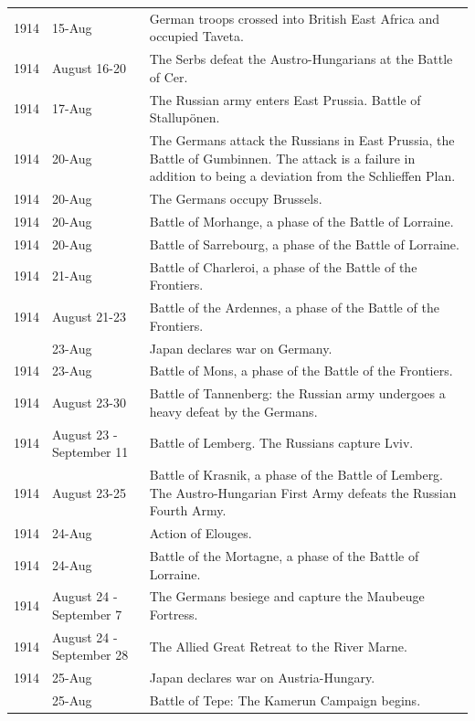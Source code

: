 \documentclass[
  openany]{book}
\begin{document}
\begin{longtable}[t]{rl>{\raggedright\arraybackslash}p{22em}}
\rowcolor{gray!6}  1914 & 15-Aug & German troops crossed into British East Africa and occupied Taveta.\\
1914 & August 16-20 & The Serbs defeat the Austro-Hungarians at the Battle of Cer.\\
\rowcolor{gray!6}  1914 & 17-Aug & The Russian army enters East Prussia. Battle of Stallupönen.\\
1914 & 20-Aug & The Germans attack the Russians in East Prussia, the Battle of Gumbinnen.  The attack is a failure in addition to being a deviation from the Schlieffen Plan.\\
\addlinespace
\rowcolor{gray!6}  1914 & 20-Aug & The Germans occupy Brussels.\\
1914 & 20-Aug & Battle of Morhange, a phase of the Battle of Lorraine.\\
\rowcolor{gray!6}  1914 & 20-Aug & Battle of Sarrebourg, a phase of the Battle of Lorraine.\\
1914 & 21-Aug & Battle of Charleroi, a phase of the Battle of the Frontiers.\\
\rowcolor{gray!6}  1914 & August 21-23 & Battle of the Ardennes, a phase of the Battle of the Frontiers.\\
\addlinespace
1914 & 23-Aug & Japan declares war on Germany.\\
\rowcolor{gray!6}  1914 & 23-Aug & Battle of Mons, a phase of the Battle of the Frontiers.\\
1914 & August 23-30 & Battle of Tannenberg: the Russian army undergoes a heavy defeat by the Germans.\\
\rowcolor{gray!6}  1914 & August 23 - September 11 & Battle of Lemberg. The Russians capture Lviv.\\
1914 & August 23-25 & Battle of Krasnik, a phase of the Battle of Lemberg. The Austro-Hungarian First Army defeats the Russian Fourth Army.\\
\addlinespace
\rowcolor{gray!6}  1914 & 24-Aug & Action of Elouges.\\
1914 & 24-Aug & Battle of the Mortagne, a phase of the Battle of Lorraine.\\
\rowcolor{gray!6}  1914 & August 24 - September 7 & The Germans besiege and capture the Maubeuge Fortress.\\
1914 & August 24 - September 28 & The Allied Great Retreat to the River Marne.\\
\rowcolor{gray!6}  1914 & 25-Aug & Japan declares war on Austria-Hungary.\\
\addlinespace
1914 & 25-Aug & Battle of Tepe: The Kamerun Campaign begins.\\

\end{longtable}
\end{document}
